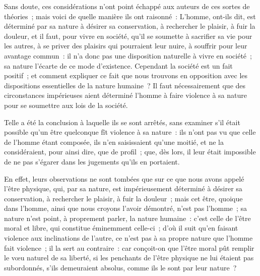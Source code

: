 \documentclass[french,twoside]{book} %
\begin{document}
Sans doute, ces considérations n’ont point échappé aux auteurs de ces sortes de théories ; mais voici de quelle manière ils ont raisonné : L’homme, ont-ils dit, est déterminé par sa nature à désirer sa conservation, à rechercher le plaisir, à fuir la douleur, et il faut, pour vivre en société, qu’il se soumette à sacrifier sa vie pour les autres, à se priver des plaisirs qui pourraient leur nuire, à souffrir pour leur avantage commun : il n’a donc pas une disposition naturelle à vivre en société ; sa nature l’écarte de ce mode d’existence. Cependant la société est un fait positif ; et comment expliquer ce fait que nous trouvons en opposition avec les dispositions essentielles de la nature humaine ? Il faut nécessairement que des circonstances impérieuses aient déterminé l’homme à faire violence à sa nature pour se soumettre aux lois de la société.\par
Telle a été la conclusion à laquelle ils se sont arrêtés, sans examiner s’il était possible qu’un être quelconque fît violence à sa nature : ils n’ont pas vu que celle de l’homme étant composée, ils n’en saisissaient qu’une moitié, et ne la considéraient, pour ainsi dire, que de profil ; que, dès lors, il leur était impossible de ne pas s’égarer dans les jugements qu’ils en portaient.\par
En effet, leurs observations ne sont tombées que sur ce que nous avons appelé l’être physique, qui, par sa nature, est impérieusement déterminé à désirer sa conservation, à rechercher le plaisir, à fuir la douleur ; mais cet être, quoique dans l’homme, ainsi que nous croyons l’avoir démontré, n’est pas l’homme ; sa nature n’est point, à proprement parler, la nature humaine : c’est celle de l’être moral et libre, qui constitue éminemment celle-ci ; d’où il suit qu’en faisant violence aux inclinations de l’autre, ce n’est pas à sa propre nature que l’homme fait violence ; il la sert au contraire : car conçoit-on que l’être moral pût remplir le vœu naturel de sa liberté, si les penchants de l’être physique ne lui étaient pas subordonnés, s’ils demeuraient absolus, comme ils le sont par leur nature ?\par
\end{document}

